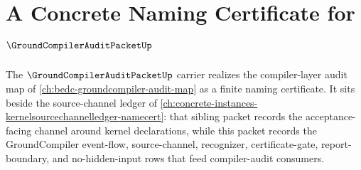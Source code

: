 \chapter{A Concrete Naming Certificate for $\GroundCompilerAuditPacketUp$}
\label{ch:concrete-instances-groundcompiler-audit-packet-namecert}

The $\GroundCompilerAuditPacketUp$ carrier realizes the compiler-layer audit map of \autoref{ch:bedc-groundcompiler-audit-map} as a finite naming certificate. It sits beside the source-channel ledger of \autoref{ch:concrete-instances-kernelsourcechannelledger-namecert}: that sibling packet records the acceptance-facing channel around kernel declarations, while this packet records the GroundCompiler event-flow, source-channel, recognizer, certificate-gate, report-boundary, and no-hidden-input rows that feed compiler-audit consumers.

